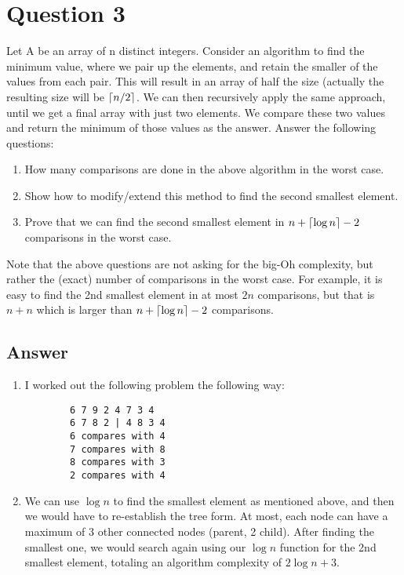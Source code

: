 \documentclass[
	12pt
]{fphw}
\DeclarePairedDelimiter\ceil{\lceil}{\rceil}
\begin{document}
\pagebreak
\section*{Question 3}

\begin{problem}
	Let A be an array of n distinct integers. Consider an algorithm to find the minimum value, where we pair up the elements, and retain the smaller of the values from each pair. This will result in an array of half the size (actually the resulting size will be $\ceil*{n/2}$. We can then recursively apply the same approach, until we get a final array with just two elements. We compare these two values and return the minimum of those values as the answer. Answer the following questions:
	
	
	
	
	\medskip
	
	\begin{enumerate}
		\item How many comparisons are done in the above algorithm in the worst case.
		\item Show how to modify/extend this method to find the second smallest element.
		\item Prove that we can find the second smallest element in $n + \ceil*{\log n} - 2$ comparisons in the worst case.
	\end{enumerate}

	Note that the above questions are not asking for the big-Oh complexity, but rather the (exact) number of comparisons in the worst case. For example, it is easy to find the 2nd smallest element in at most $2n$ comparisons, but that is $n + n$ which is larger than $n + \ceil*{\log n} - 2$ comparisons.
\end{problem}


\subsection*{Answer} 

\begin{enumerate}
	\item I worked out the following problem the following way:
	\begin{verbatim}
		6 7 9 2 4 7 3 4
		6 7 8 2 | 4 8 3 4
		6 compares with 4
		7 compares with 8
		8 compares with 3
		2 compares with 4
	\end{verbatim}
	\item We can use $\log n$ to find the smallest element as mentioned above, and then we would have to re-establish the tree form. At most, each node can have a maximum of $3$ other connected nodes (parent, 2 child). After finding the smallest one, we would search again using our $\log n$ function for the 2nd smallest element, totaling an algorithm complexity of $\boxed{2\log n + 3}$. 
\end{enumerate}

\end{document}
